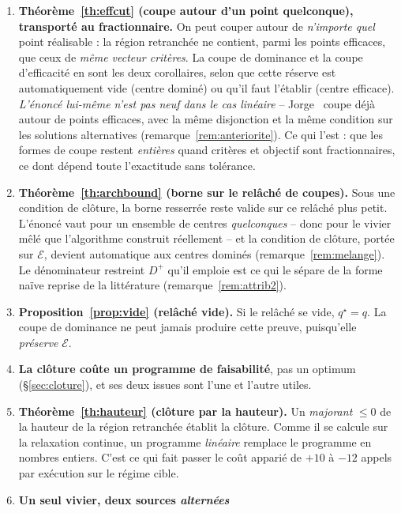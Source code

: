 \documentclass[11pt,a4paper]{article}
\theoremstyle{plain}
\theoremstyle{remark}
\newcommand{\Ecal}{\mathcal{E}}
\newcommand{\qs}{q^{\star}}
\begin{document}
\begin{enumerate}[leftmargin=*,itemsep=3pt]
\item \textbf{Théorème~\ref{th:effcut} (coupe autour d'un point
      quelconque), transporté au fractionnaire.} On peut couper autour de
      \emph{n'importe quel} point réalisable : la région retranchée ne
      contient, parmi les points efficaces, que ceux de \emph{même vecteur
      critères}. La coupe de dominance et la coupe d'efficacité en sont les
      deux corollaires, selon que cette réserve est automatiquement vide
      (centre dominé) ou qu'il faut l'établir (centre efficace).
      \emph{L'énoncé lui-même n'est pas neuf dans le cas linéaire} --
      Jorge~\cite{jorge2009} coupe déjà autour de points efficaces, avec la
      même disjonction et la même condition sur les solutions alternatives
      (remarque~\ref{rem:anteriorite}). Ce qui l'est : que les formes de
      coupe restent \emph{entières} quand critères et objectif sont
      fractionnaires, ce dont dépend toute l'exactitude sans tolérance.
\item \textbf{Théorème~\ref{th:archbound} (borne sur le relâché de
      coupes).} Sous une condition de clôture, la borne resserrée reste
      valide sur ce relâché plus petit. L'énoncé vaut pour un ensemble de
      centres \emph{quelconques} -- donc pour le vivier mêlé que
      l'algorithme construit réellement -- et la condition de clôture, portée
      sur $\Ecal$, devient automatique aux centres dominés
      (remarque~\ref{rem:melange}). Le dénominateur restreint $D^{+}$ qu'il
      emploie est ce qui le sépare de la forme naïve reprise de la
      littérature (remarque~\ref{rem:attrib2}).
\item \textbf{Proposition~\ref{prop:vide} (relâché vide).} Si le relâché se
      vide, $\qs=q$. La coupe de dominance ne peut jamais produire cette
      preuve, puisqu'elle \emph{préserve} $\Ecal$.
\item \textbf{La clôture coûte un programme de faisabilité}, pas un optimum
      (\S\ref{sec:cloture}), et ses deux issues sont l'une et l'autre utiles.
\item \textbf{Théorème~\ref{th:hauteur} (clôture par la hauteur).} Un
      \emph{majorant} $\le 0$ de la hauteur de la région retranchée établit
      la clôture. Comme il se calcule sur la relaxation continue, un
      programme \emph{linéaire} remplace le programme en nombres entiers.
      C'est ce qui fait passer le coût apparié de $+10$ à $-12$ appels par
      exécution sur le régime cible.
\item \textbf{Un seul vivier, deux sources \emph{alternées}}

\end{enumerate}
\end{document}
